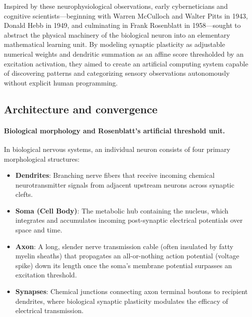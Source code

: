 Inspired by these neurophysiological observations, early cyberneticians and cognitive scientists---beginning with Warren McCulloch and Walter Pitts in 1943, Donald Hebb in 1949, and culminating in Frank Rosenblatt in 1958---sought to abstract the physical machinery of the biological neuron into an elementary mathematical learning unit. By modeling synaptic plasticity as adjustable numerical weights and dendritic summation as an affine score thresholded by an excitation activation, they aimed to create an artificial computing system capable of discovering patterns and categorizing sensory observations autonomously without explicit human programming.

\subsection{Architecture and convergence}
\label{sec:biological_and_artificial_neuron}
\label{sec:perceptron_learning_algorithm}

\paragraph{Biological morphology and Rosenblatt's artificial threshold unit.}
In biological nervous systems, an individual neuron consists of four primary morphological structures:
\begin{itemize}[noitemsep,topsep=2pt,parsep=0pt,partopsep=0pt]
  \item \textbf{Dendrites}: Branching nerve fibers that receive incoming chemical neurotransmitter signals from adjacent upstream neurons across synaptic clefts.
  \item \textbf{Soma (Cell Body)}: The metabolic hub containing the nucleus, which integrates and accumulates incoming post-synaptic electrical potentials over space and time.
  \item \textbf{Axon}: A long, slender nerve transmission cable (often insulated by fatty myelin sheaths) that propagates an all-or-nothing action potential (voltage spike) down its length once the soma's membrane potential surpasses an excitation threshold.
  \item \textbf{Synapses}: Chemical junctions connecting axon terminal boutons to recipient dendrites, where biological synaptic plasticity modulates the efficacy of electrical transmission.
\end{itemize}

